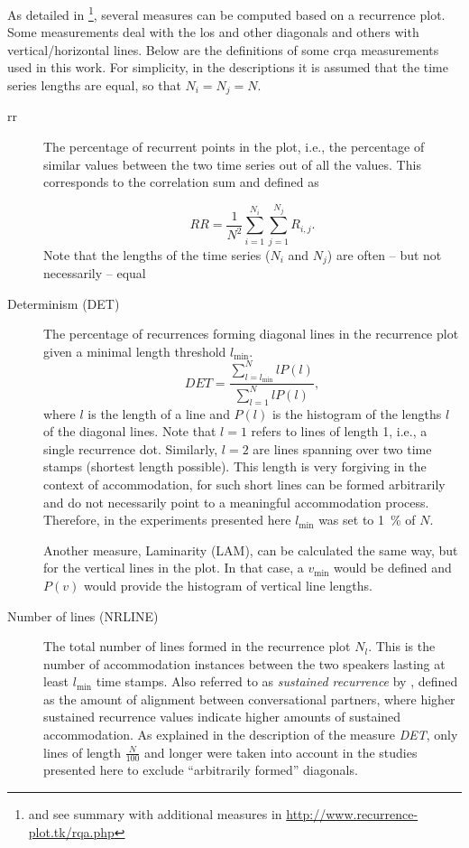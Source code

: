 As detailed in \citet{Marwan2007recurrence}\footnote{and see summary with additional measures in \url{http://www.recurrence-plot.tk/rqa.php}}, several measures can be computed based on a recurrence plot.
Some measurements deal with the \ac{los} and other diagonals and others with vertical/horizontal lines.
Below are the definitions of some \ac{crqa} measurements used in this work.
For simplicity, in the descriptions it is assumed that the time series lengths are equal, so that $N_i=N_j=N$.

\begin{description}
	\item[\Acf{rr}] The percentage of recurrent points in the plot, i.e., the percentage of similar values between the two time series out of all the values.
	This corresponds to the correlation sum and defined as
	
	\begin{equation}
	\label{eq:rr}
	RR = \frac{1}{N^2} \sum_{i=1}^{N_i} \sum_{j=1}^{N_j} R_{i,j}.
	\end{equation}
	Note that the lengths of the time series ($N_i$ and $N_j$) are often -- but not necessarily -- equal
	
	\item[Determinism (DET)] The percentage of recurrences forming diagonal lines in the recurrence plot given a minimal length threshold $l_{\min}$.
	\begin{equation}
	\label{eq:det}
	DET = \frac{\sum_{l=l_{\min}}^{N} l P(l)}{\sum_{l=1}^N l P(l)},
	\end{equation}
	where $l$ is the length of a line and $P(l)$ is the histogram of the lengths $l$ of the diagonal lines.
	Note that $l=1$ refers to lines of length 1, i.e., a single recurrence dot.	
	Similarly, $l=2$ are lines spanning over two time stamps (shortest length possible).
	This length is very forgiving in the context of accommodation, for such short lines can be formed arbitrarily and do not necessarily point to a meaningful accommodation process.
	Therefore, in the experiments presented here $l_{\min}$ was set to \SI{1}{\percent} of $N$.
	
	Another measure, Laminarity (LAM), can be calculated the same way, but for the vertical lines in the plot.
	In that case, a $v_{\min}$ would be defined and $P(v)$ would provide the histogram of vertical line lengths.
	
	\item[Number of lines (NRLINE)] The total number of lines formed in the recurrence plot $N_l$.
	This is the number of accommodation instances between the two speakers lasting at least $l_{\min}$ time stamps.
	Also referred to as \emph{sustained recurrence} by \citet{Borrie2019syncing}, defined as the amount of alignment between conversational partners, where higher sustained recurrence values indicate higher amounts of sustained accommodation.
	As explained in the description of the measure \emph{DET}, only lines of length $\frac{N}{100}$ and longer were taken into account in the studies presented here to exclude \enquote{arbitrarily formed} diagonals.
	

\end{description}
